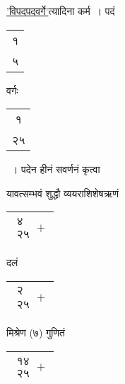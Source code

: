 \documentclass[10pt, openany]{book}
\begin{document}
{{{{\hyperref[88]{'विपदपदवर्गे'}त्यादिना कर्म~। पदं \begin{tabular}{|c|} १ \\५\\\hline \end{tabular} वर्गः \begin{tabular}{|c|} १\\ २५\\\hline \end{tabular}~। पदेन
हीनं सवर्णनं कृत्वा}
{यावत्सम्भवं शुद्धौ व्ययराशिशेषऋणं \begin{tabular}{|c|} $\begin{matrix}
\mbox{{४}}\\
\mbox{{२५}}
\end{matrix}+$\\\hline \end{tabular} दलं \begin{tabular}{|c|} $\begin{matrix}
\mbox{{२}}\\
\mbox{{२५}}
\end{matrix}+$\\\hline \end{tabular} मिश्रेण (७) गुणितं \begin{tabular}{|c|}$\begin{matrix}
\mbox{{१४}}\\
\mbox{{२५}}
\end{matrix}+$\\\hline \end{tabular}}

\newpage

}}}
\end{document}
